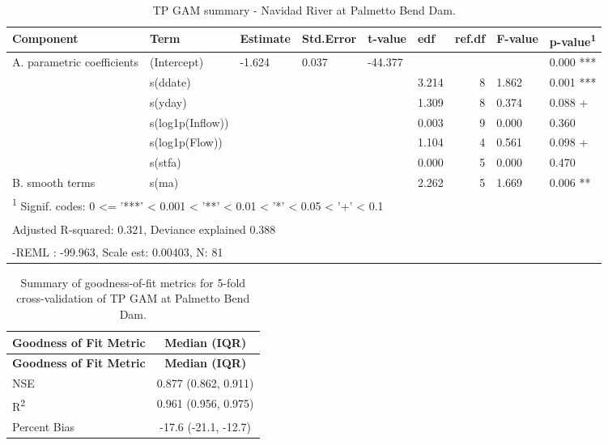 \documentclass[
]{article}
\newenvironment{widestuff}{\begin{table}[h]\begin{adjustwidth}{-4.5cm}{-4.5cm}\centering}{\end{adjustwidth}\end{table}}
\begin{document}
\begin{widestuff}

\caption{TP GAM summary - Navidad River at Palmetto Bend Dam.}
\centering
\begin{tabular}[t]{llllllrll}
\toprule
Component & Term & Estimate & Std.Error & t-value & edf & ref.df & F-value & p-value\textsuperscript{1}\\
\midrule
A. parametric coefficients & (Intercept) & -1.624 & 0.037 & -44.377 &  &  &  & 0.000 ***\\
\cmidrule{1-9}
 & s(ddate) &  &  &  & 3.214 & 8 & 1.862 & 0.001 ***\\

 & s(yday) &  &  &  & 1.309 & 8 & 0.374 & 0.088 +\\

 & s(log1p(Inflow)) &  &  &  & 0.003 & 9 & 0.000 & 0.360\\

 & s(log1p(Flow)) &  &  &  & 1.104 & 4 & 0.561 & 0.098 +\\

 & s(stfa) &  &  &  & 0.000 & 5 & 0.000 & 0.470\\

\multirow[t]{-6}{*}{\raggedright\arraybackslash B. smooth terms} & s(ma) &  &  &  & 2.262 & 5 & 1.669 & 0.006 **\\
\bottomrule
\multicolumn{9}{l}{\textsuperscript{1} Signif. codes: 0 <= '***' < 0.001 < '**' < 0.01 < '*' < 0.05 < '+' < 0.1}\\
\multicolumn{9}{l}{\textsuperscript{} Adjusted R-squared: 0.321, Deviance explained 0.388}\\
\multicolumn{9}{l}{\textsuperscript{} -REML : -99.963, Scale est: 0.00403, N: 81}\\
\end{tabular}
\end{widestuff}

\hypertarget{tbl-TPPalmettoBend-CV}{}
\begin{longtable}[]{@{}lc@{}}
\caption{\label{tbl-TPPalmettoBend-CV}Summary of goodness-of-fit metrics
for 5-fold cross-validation of TP GAM at Palmetto Bend
Dam.}\tabularnewline
\toprule()
\textbf{Goodness of Fit Metric} & \textbf{Median (IQR)} \\
\midrule()
\endfirsthead
\toprule()
\textbf{Goodness of Fit Metric} & \textbf{Median (IQR)} \\
\midrule()
\endhead
NSE & 0.877 (0.862, 0.911) \\
R\textsuperscript{2} & 0.961 (0.956, 0.975) \\
Percent Bias & -17.6 (-21.1, -12.7) \\
\bottomrule()
\end{longtable}
\end{document}
